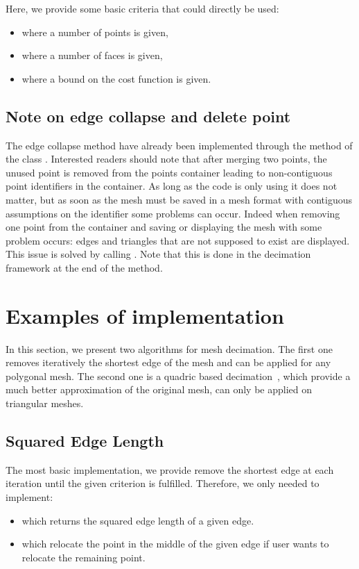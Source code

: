 \documentclass{InsightArticle}
\theoremstyle{plain}
\begin{document}
Here, we provide some basic criteria that could directly be used:
\begin{itemize}
 \item {} where a number of points is given,
 \item {} where a number of faces is given,
 \item {} where a bound on the cost function is given.
\end{itemize}

\subsection{Note on edge collapse and delete point}
The edge collapse method have already been implemented through the method  of the class . Interested readers should note that after merging two points, the unused point is removed from the points container leading to non-contiguous point identifiers in the container. As long as the code is only using  it does not matter, but as soon as the mesh must be saved in a mesh format with contiguous assumptions on the identifier some problems can occur. Indeed when removing one point from the container and saving or displaying the mesh with  some problem occurs: edges and triangles that are not supposed to exist are displayed. This issue is solved by calling . Note that this is done in the decimation framework at the end of the  method.

\section{Examples of implementation}
In this section, we present two algorithms for mesh decimation. The first one removes iteratively the shortest edge of the mesh and can be applied for any polygonal mesh. The second one is a quadric based decimation~\cite{Garland97:QEM}, which provide a much better approximation of the original mesh, can only be applied on triangular meshes.
\subsection{Squared Edge Length}
The most basic implementation, we provide remove the shortest edge at each iteration until the given criterion is fulfilled. Therefore, we only needed to implement:
\begin{itemize}
 \item {} which returns the squared edge length of a given edge.
 \item {} which relocate the point in the middle of the given edge if user wants to relocate the remaining point.
\end{itemize}
\end{document}
